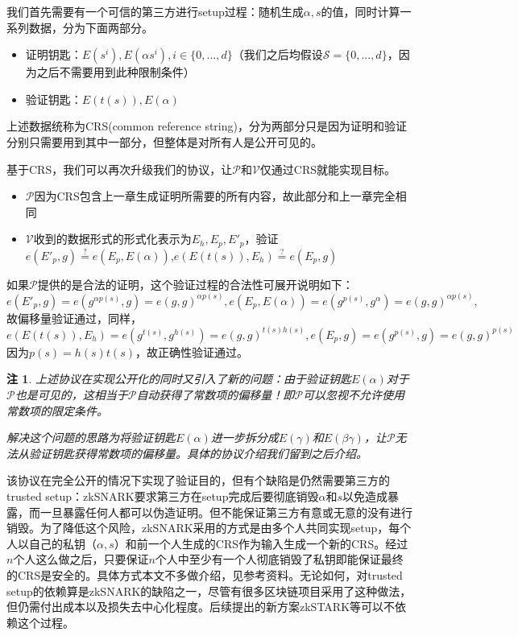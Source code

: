 \documentclass[12pt]{article}
\newcommand{\zk}{zkSNARK}
\newcommand{\ds}{\{0,...,d\}}
\newcommand{\pp}{$\mathcal{P}$}
\newcommand{\vv}{$\mathcal{V}$}
\newtheorem{remark}{注}[section]
\begin{document}
我们首先需要有一个可信的第三方进行setup过程：随机生成$\alpha,s$的值，同时计算一系列数据，分为下面两部分。
\begin{itemize}
	\item 证明钥匙：$E(s^i), E(\alpha s^i), i \in \ds $（我们之后均假设$\mathcal{S}=\ds$，因为之后不需要用到此种限制条件）
	\item 验证钥匙：$E(t(s)),E(\alpha)$
\end{itemize}
上述数据统称为CRS(common reference string)，分为两部分只是因为证明和验证分别只需要用到其中一部分，但整体是对所有人是公开可见的。

基于CRS，我们可以再次升级我们的协议，让\pp 和\vv 仅通过CRS就能实现目标。
\begin{itemize}
	\item \pp 因为CRS包含上一章生成证明所需要的所有内容，故此部分和上一章完全相同
	\item \vv 收到的数据形式的形式化表示为$E_h,E_p,E'_p$，验证\\$e(E'_p,g)\overset{?}{=} e(E_p,E(\alpha))$,$e(E(t(s)),E_h) \overset{?}{=} e(E_p,g)$
\end{itemize}
如果\pp 提供的是合法的证明，这个验证过程的合法性可展开说明如下：
$$e(E'_p,g) = e(g^{\alpha p(s)},g)=e(g,g)^{\alpha p(s)}, e(E_p,E(\alpha))=e(g^{p(s)},g^\alpha)=e(g,g)^{\alpha p(s)},$$
故偏移量验证通过，同样，
$$e(E(t(s)),E_h)=e(g^{t(s)},g^{h(s)})=e(g,g)^{t(s)h(s)}, e(E_p,g)=e(g^{p(s)},g)=e(g,g)^{p(s)}$$
因为$p(s)=h(s)t(s)$，故正确性验证通过。
\begin{remark}
\label{shift}
	上述协议在实现公开化的同时又引入了新的问题：由于验证钥匙$E(\alpha)$对于\pp 也是可见的，这相当于\pp 自动获得了常数项的偏移量！即\pp 可以忽视不允许使用常数项的限定条件。
	
	解决这个问题的思路为将验证钥匙$E(\alpha)$进一步拆分成$E(\gamma)$和$E(\beta\gamma)$，让\pp 无法从验证钥匙获得常数项的偏移量。具体的协议介绍我们留到之后介绍。
\end{remark}
该协议在完全公开的情况下实现了验证目的，但有个缺陷是仍然需要第三方的trusted setup：\zk 要求第三方在setup完成后要彻底销毁$\alpha$和$s$以免造成暴露，而一旦暴露任何人都可以伪造证明。但不能保证第三方有意或无意的没有进行销毁。为了降低这个风险，\zk 采用的方式是由多个人共同实现setup，每个人以自己的私钥（$\alpha,s$）和前一个人生成的CRS作为输入生成一个新的CRS。经过$n$个人这么做之后，只要保证$n$个人中至少有一个人彻底销毁了私钥即能保证最终的CRS是安全的。具体方式本文不多做介绍，见参考资料。无论如何，对trusted setup的依赖算是\zk 的缺陷之一，尽管有很多区块链项目采用了这种做法，但仍需付出成本以及损失去中心化程度。后续提出的新方案zkSTARK等可以不依赖这个过程。
\end{document}
